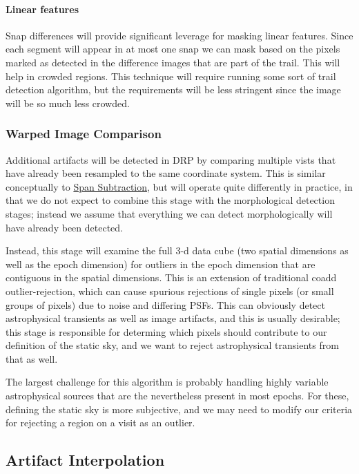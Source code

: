 \paragraph{Linear features}
Snap differences will provide significant leverage for masking linear features.  Since each segment will appear in at most one snap we can mask based on the pixels marked as detected in the difference images that are part of the trail.  This will help in crowded regions.  This technique will require running some sort of trail detection algorithm, but the requirements will be less stringent since the image will be so much less crowded.

\subsubsection{Warped Image Comparison}
\label{sec:acWarpedImageArtifactDetection}

Additional artifacts will be detected in DRP by comparing multiple vists that have already been resampled to the same coordinate system.  This is similar conceptually to \hyperref[sec:acSnapSubtraction]{Span Subtraction}, but will operate quite differently in practice, in that we do not expect to combine this stage with the morphological detection stages; instead we assume that everything we can detect morphologically will have already been detected.

Instead, this stage will examine the full 3-d data cube (two spatial dimensions as well as the epoch dimension) for outliers in the epoch dimension that are contiguous in the spatial dimensions.  This is an extension of traditional coadd outlier-rejection, which can cause spurious rejections of single pixels (or small groups of pixels) due to noise and differing PSFs.  This can obviously detect astrophysical transients as well as image artifacts, and this is usually desirable; this stage is responsible for determing which pixels should contribute to our definition of the static sky, and we want to reject astrophysical transients from that as well.

The largest challenge for this algorithm is probably handling highly variable astrophysical sources that are the nevertheless present in most epochs.  For these, defining the static sky is more subjective, and we may need to modify our criteria for rejecting a region on a visit as an outlier.


\subsection{Artifact Interpolation}
\label{sec:acArtifactInterpolation}

